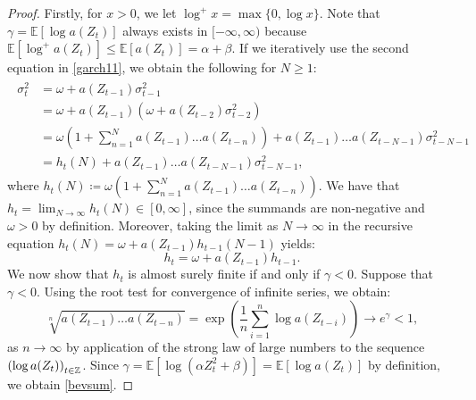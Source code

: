\begin{proof}
Firstly, for $x>0$, we let $\log^{+}x=\max\{0,\log x\}$. Note that $\gamma=\mathbb{E}[\log a(Z_{t})]$ always exists in $[-\infty,\infty)$ because $\mathbb{E}[\log^{+}a(Z_{t})]\leq \mathbb{E}[a(Z_{t})]=\alpha+\beta$. If we iteratively use the second equation in \eqref{garch11}, we obtain the following for $N\geq 1$:
\begin{align}\label{sigmaballs}
    \begin{split}
        \sigma_{t}^{2}& = \omega +a(Z_{t-1})\sigma_{t-1}^{2}\\
        & = \omega + a(Z_{t-1})\left(\omega+a(Z_{t-2})\sigma_{t-2}^{2}\right)\\
        & = \omega\left(1+\sum_{n=1}^{N}a(Z_{t-1})\dots a(Z_{t-n})\right)+a(Z_{t-1})\dots a(Z_{t-N-1})\sigma_{t-N-1}^{2}\\
        & = h_{t}(N)+a(Z_{t-1})\dots a(Z_{t-N-1})\sigma_{t-N-1}^{2},
    \end{split}
\end{align}
where $h_{t}(N)\coloneqq \omega\left(1+\sum_{n=1}^{N}a(Z_{t-1})\dots a(Z_{t-n})\right)$. We have that $h_{t}=\lim_{N\to\infty}h_{t}(N)\in [0,\infty]$, since the summands are non-negative and $\omega>0$ by definition. Moreover, taking the limit as $N\to\infty$ in the recursive equation $h_{t}(N)=\omega+a(Z_{t-1})h_{t-1}(N-1)$ yields: 
\begin{equation}
    h_{t}=\omega+a(Z_{t-1})h_{t-1}. 
\end{equation}
We now show that $h_t$ is almost surely finite if and only if $\gamma<0$. Suppose that $\gamma<0$. Using the root test for convergence of infinite series, we obtain:
\begin{equation}\label{bevsum}
    \sqrt[n]{a(Z_{t-1})\dots a(Z_{t-n})}=\exp\left(\frac{1}{n}\sum_{i=1}^{n}\log a(Z_{t-i})\right)\to e^{\gamma}<1,
\end{equation}
as $n\to \infty$ by application of the strong law of large numbers to the sequence $\left(\log a(Z_{t})\right)_{t\in\Z}$. 
Since $\gamma = \mathbb{E}[\log(\alpha Z_{t}^{2}+\beta)]=\mathbb{E}[\log a(Z_{t})]$ by definition, we obtain \eqref{bevsum}.

\end{proof}
